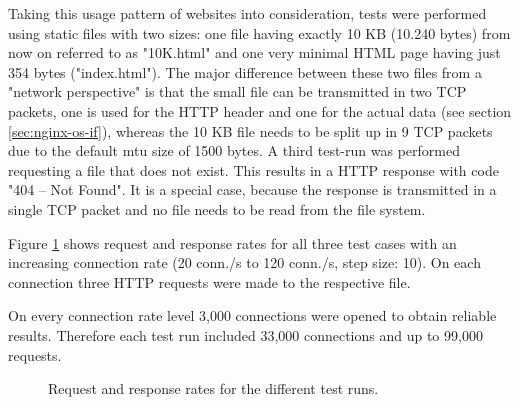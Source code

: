Taking this usage pattern of websites into consideration, tests were performed using static files with two sizes: one file having exactly 10 KB (10.240 bytes) from now on referred to as "10K.html" and one very minimal HTML page having just 354 bytes ("index.html"). The major difference between these two files from a "network perspective" is that the small file can be transmitted in two TCP packets, one is used for the HTTP header and one for the actual data (see section \ref{sec:nginx-os-if}), whereas the 10 KB file needs to be split up in 9 TCP packets due to the default \gls{mtu} size of 1500 bytes. A third test-run was performed requesting a file that does not exist. This results in a HTTP response with code "404 -- Not Found". It is a special case, because the response is transmitted in a single TCP packet and no file needs to be read from the file system.

Figure \ref{fig:initial-req} shows request and response rates for all three test cases with an increasing connection rate (20 conn./s to 120 conn./s, step size: 10). On each connection three HTTP requests were made to the respective file. 

On every connection rate level 3,000 connections were opened to obtain reliable results. Therefore each test run included 33,000 connections and up to 99,000 requests.

\begin{figure}[H]
	\centering
  \caption{Request and response rates for the different test runs.}
  \label{fig:initial-req}
\end{figure}

